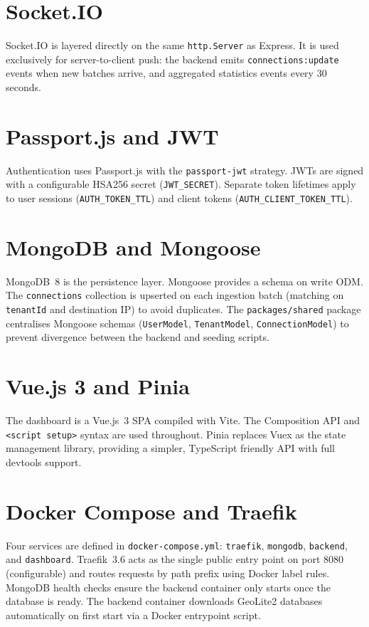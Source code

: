 \documentclass[12pt]{report}
\begin{document}
\section{Socket.IO}

Socket.IO is layered directly on the same \texttt{http.Server} as Express. It is used
exclusively for server-to-client push: the backend emits \texttt{connections:update} events
when new batches arrive, and aggregated statistics events every 30 seconds.

\newpage
\section{Passport.js and JWT}

Authentication uses Passport.js with the \texttt{passport-jwt} strategy. JWTs are signed with
a configurable HSA256 secret (\texttt{JWT\_SECRET}). Separate token lifetimes apply to user
sessions (\texttt{AUTH\_TOKEN\_TTL}) and client tokens
(\texttt{AUTH\_CLIENT\_TOKEN\_TTL}).

\section{MongoDB and Mongoose}

MongoDB~8 is the persistence layer. Mongoose provides a schema on write ODM. The
\texttt{connections} collection is upserted on each ingestion batch (matching on
\texttt{tenantId} and destination IP) to avoid duplicates. The
\texttt{packages/shared} package centralises Mongoose schemas (\texttt{UserModel},
\texttt{TenantModel}, \texttt{ConnectionModel}) to prevent divergence between the backend and
seeding scripts.

\section{Vue.js 3 and Pinia}

The dashboard is a Vue.js~3 SPA compiled with Vite. The Composition API and
\texttt{<script setup>} syntax are used throughout. Pinia replaces Vuex as the state
management library, providing a simpler, TypeScript friendly API with full devtools support.

\section{Docker Compose and Traefik}

Four services are defined in \texttt{docker-compose.yml}: \texttt{traefik},
\texttt{mongodb}, \texttt{backend}, and \texttt{dashboard}. Traefik~3.6 acts as the single
public entry point on port 8080 (configurable) and routes requests by path prefix using Docker
label rules. MongoDB health checks ensure the backend container only starts once the database
is ready. The backend container downloads GeoLite2 databases automatically on first start via
a Docker entrypoint script.
\end{document}
